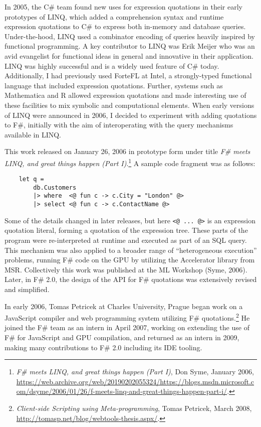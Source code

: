 \documentclass[acmsmall,review]{acmart}\settopmatter{printfolios=true,printccs=false,printacmref=false}
\begin{document}
In 2005, the C\# team found new uses for expression quotations in their early prototypes of LINQ, which added a comprehension syntax and runtime expression quotations to C\# to express both in-memory and database queries. Under-the-hood, LINQ used a combinator encoding of queries heavily inspired by functional programming. A key contributor to LINQ was Erik Meijer who was an avid evangelist for functional ideas in general and innovative in their application. LINQ was highly successful and is a widely used feature of C\# today.  Additionally, I had previously used ForteFL at Intel, a strongly-typed functional language that included expression quotations.  Further, systems such as Mathematica and R allowed expression quotations and made interesting use of these facilities to mix symbolic and computational elements. When early versions of LINQ were announced in 2006, I decided to experiment with adding quotations to F\#, initially with the aim of interoperating with the query mechanisms available in LINQ.  

This work released on January 26, 2006 in prototype form under title \textit{F\# meets LINQ, and great things happen (Part I)}.\footnote{\textit{F\# meets LINQ, and great things happen (Part I)}, Don Syme, January 2006, \url{https://web.archive.org/web/20190202055324/https://blogs.msdn.microsoft.com/dsyme/2006/01/26/f-meets-linq-and-great-things-happen-part-i/}.}   A sample code fragment was as follows:

\begin{verbatim}
    let q =
        db.Customers
        |> where  <@ fun c -> c.City = "London" @> 
        |> select <@ fun c -> c.ContactName @>
\end{verbatim}
Some of the details changed in later releases, but here \verb$<@ ... @>$ is an expression quotation literal, forming a quotation of the expression tree. These parts of the program were re-interpreted at runtime and executed as part of an SQL query.  This mechanism was also applied to a broader range of “heterogeneous execution” problems, running F\# code on the GPU by utilizing the Accelerator library from MSR. Collectively this work was published at the ML Workshop (Syme, 2006). Later, in F\# 2.0, the design of the API for F\# quotations was extensively revised and simplified.

In early 2006, Tomas Petricek at Charles University, Prague began work on a JavaScript compiler and web programming
system utilizing F\# quotations.\footnote{\textit{Client-side Scripting using Meta-programming}, Tomas Petricek, March 2008, \url{http://tomasp.net/blog/webtools-thesis.aspx/}.}  He
joined the F\# team as an intern in April 2007, working on extending the use of F\# for JavaScript and GPU compilation,
and returned as an intern in 2009, making many contributions to F\# 2.0 including its IDE tooling.
\end{document}

